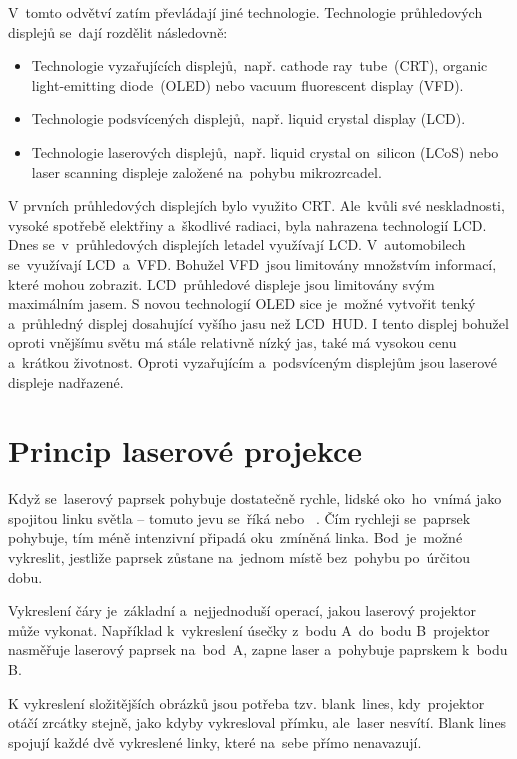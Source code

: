 V~tomto odvětví zatím převládají jiné technologie. Technologie průhledových displejů se~dají rozdělit následovně:
\begin{itemize}
  \item Technologie vyzařujících displejů,~např. cathode ray~tube~(CRT), organic light-emitting diode~(OLED) nebo vacuum fluorescent display (VFD).
  \item Technologie podsvícených displejů,~např. liquid crystal display (LCD).
  \item Technologie laserových displejů,~např. liquid crystal on~silicon (LCoS) nebo laser scanning displeje založené na~pohybu mikrozrcadel.~\cite{dev-of-laser-huds-in-driving}
\end{itemize}

V prvních průhledových displejích bylo využito CRT. Ale~kvůli své neskladnosti, vysoké spotřebě elektřiny a~škodlivé radiaci, byla nahrazena technologií LCD. Dnes se~v~průhledových displejích letadel využívají LCD. V~automobilech se~využívají LCD~a~VFD.
Bohužel VFD~jsou limitovány množstvím informací, které mohou zobrazit. LCD~průhledové displeje jsou limitovány svým maximálním jasem.
S novou technologií OLED sice je~možné vytvořit tenký a~průhledný displej dosahující vyšího jasu než LCD~HUD.
I tento displej bohužel oproti vnějšímu světu má stále relativně nízký jas, také má vysokou cenu a~krátkou životnost.
Oproti vyzařujícím a~podsvíceným displejům jsou laserové displeje nadřazené.~\cite{dev-of-laser-huds-in-driving}

\section{Princip laserové projekce}\label{sec:projection-princip}
Když se~laserový paprsek pohybuje dostatečně rychle, lidské oko~ho~vnímá jako spojitou linku světla -- tomuto jevu se~říká  nebo ~\cite{persistance-of-vision}.
Čím rychleji se~paprsek pohybuje, tím méně intenzivní připadá oku~zmíněná linka. Bod~je~možné vykreslit, jestliže paprsek zůstane na~jednom místě bez~pohybu po~úrčitou dobu.~\cite{laser-projection}

Vykreslení čáry je~základní a~nejjednoduší operací, jakou laserový projektor může vykonat. Například k~vykreslení úsečky z~bodu A~do~bodu B~projektor nasměřuje laserový paprsek na~bod~A, zapne laser a~pohybuje paprskem k~bodu B.~\cite{laser-projection}

K vykreslení složitějších obrázků jsou potřeba tzv. blank\ lines, kdy~projektor otáčí zrcátky stejně, jako kdyby vykresloval přímku, ale~laser nesvítí. Blank lines spojují každé dvě vykreslené linky, které na~sebe přímo nenavazují.~\cite{laser-projection}

